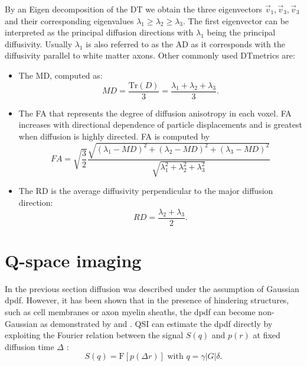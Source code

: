 By an Eigen decomposition of the {\gls{DT}} we obtain the three eigenvectors $\vec{v}_1, \vec{v}_3, \vec{v}_3$ and their corresponding eigenvalues $\lambda_1\ge\lambda_2\ge\lambda_3$. The first eigenvector can be interpreted as the principal diffusion directions with $\lambda_1$ being the principal diffusivity. Usually $\lambda_1$ is also referred to as the {\gls{AD}} as it corresponds with the diffusivity parallel to white matter axons\citep{Basser:1996}. Other commonly used {\gls{DT}}metrics are:
\begin{itemize}
	\item The {\gls{MD}}, computed as:
	\begin{equation}
		MD = \frac{\mbox{Tr}(D)}{3} = \frac{\lambda_1 + \lambda_2 +\lambda_3}{3}.
	\end{equation}
	\item The {\gls{FA}} that represents the degree of diffusion anisotropy in each voxel.  {\gls{FA}} increases
	with directional dependence of particle displacements and is greatest when diffusion is highly directed.  {\gls{FA}} is computed by
	\begin{equation}
		FA = \sqrt{\frac{3}{2}}\frac{\sqrt{(\lambda_1-MD)^2+(\lambda_2-MD)^2+(\lambda_3-MD)^2}}{\sqrt{\lambda_1^2+\lambda_2^2+\lambda_3^2}}
	\end{equation}
	\item The {\gls{RD}} is the average diffusivity perpendicular to the major diffusion direction:
	\begin{equation}
		RD = \frac{\lambda_2 + \lambda_3}{2}.
	\end{equation}
\end{itemize}


\section{Q-space imaging}
\label{sec:qspace}
In the previous section diffusion was described under the assumption of Gaussian  {\gls{dpdf}}. However, it has been shown that in the presence of hindering structures, such as cell membranes or axon myelin sheaths, the  {\gls{dpdf}} can become non-Gaussian as demonstrated by \citet{Callaghan:1996} and \citet{Liu:2005}. \gls{QSI} can estimate the  {\gls{dpdf}} directly by exploiting the Fourier relation between the signal $S(q)$ and $p(r)$ at fixed diffusion time $\Delta$ \citep{Callaghan:1994}:
\begin{equation}
	\label{eq:qspaceft}
	S(q)=\mbox{F}\left[p(\Delta r)\right] \mbox{ with } q = \gamma|G|\delta. 
\end{equation}
